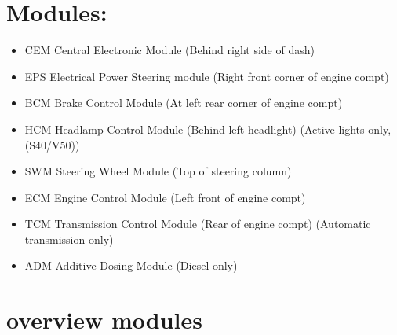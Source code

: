 \documentclass[letterpaper,10pt,english]{sphinxmanual}
\begin{document}
\section{Modules:}
\label{\detokenize{canbus/volvo-modules:modules}}\begin{itemize}
\item {} 
\sphinxAtStartPar
CEM     Central Electronic Module (Behind right side of dash)

\item {} 
\sphinxAtStartPar
EPS     Electrical Power Steering module (Right front corner of engine compt)

\item {} 
\sphinxAtStartPar
BCM     Brake Control Module (At left rear corner of engine compt)

\item {} 
\sphinxAtStartPar
HCM     Headlamp Control Module (Behind left headlight) (Active lights only, (S40/V50))

\item {} 
\sphinxAtStartPar
SWM     Steering Wheel Module (Top of steering column)

\item {} 
\sphinxAtStartPar
ECM     Engine Control Module (Left front of engine compt)

\item {} 
\sphinxAtStartPar
TCM     Transmission Control Module (Rear of engine compt) (Automatic transmission only)

\item {} 
\sphinxAtStartPar
ADM     Additive Dosing Module (Diesel only)

\end{itemize}


\section{overview modules}
\label{\detokenize{canbus/modules:overview-modules}}\label{\detokenize{canbus/modules::doc}}
\end{document}
